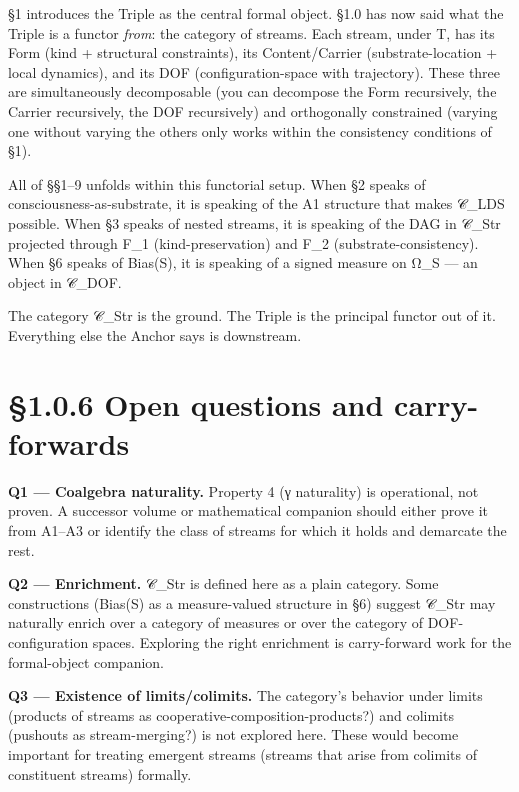 \documentclass[11pt, openany]{book}
\newcommand{\sectionbreak}{\clearpage}
\begin{document}
§1 introduces the Triple as the central formal object. §1.0 has now said what the Triple is a functor \textit{from}: the category of streams. Each stream, under T, has its Form (kind + structural constraints), its Content/Carrier (substrate-location + local dynamics), and its DOF (configuration-space with trajectory). These three are simultaneously decomposable (you can decompose the Form recursively, the Carrier recursively, the DOF recursively) and orthogonally constrained (varying one without varying the others only works within the consistency conditions of §1).

All of §§1–9 unfolds within this functorial setup. When §2 speaks of consciousness-as-substrate, it is speaking of the A1 structure that makes 𝒞\_\allowbreak{}LDS possible. When §3 speaks of nested streams, it is speaking of the DAG in 𝒞\_\allowbreak{}Str projected through F\_\allowbreak{}1 (kind-preservation) and F\_\allowbreak{}2 (substrate-consistency). When §6 speaks of Bias(S), it is speaking of a signed measure on Ω\_\allowbreak{}S --- an object in 𝒞\_\allowbreak{}DOF.

The category 𝒞\_\allowbreak{}Str is the ground. The Triple is the principal functor out of it. Everything else the Anchor says is downstream.

\sectionbreak

\section{§1.0.6 Open questions and carry-forwards}

\textbf{Q1 --- Coalgebra naturality.} Property 4 (γ naturality) is operational, not proven. A successor volume or mathematical companion should either prove it from A1–A3 or identify the class of streams for which it holds and demarcate the rest.

\textbf{Q2 --- Enrichment.} 𝒞\_\allowbreak{}Str is defined here as a plain category. Some constructions (Bias(S) as a measure-valued structure in §6) suggest 𝒞\_\allowbreak{}Str may naturally enrich over a category of measures or over the category of DOF-configuration spaces. Exploring the right enrichment is carry-forward work for the formal-object companion.

\textbf{Q3 --- Existence of limits/colimits.} The category's behavior under limits (products of streams as cooperative-composition-products?) and colimits (pushouts as stream-merging?) is not explored here. These would become important for treating emergent streams (streams that arise from colimits of constituent streams) formally.
\end{document}
